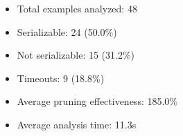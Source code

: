 \begin{itemize}
\item Total examples analyzed: 48
\item Serializable: 24 (50.0\%)
\item Not serializable: 15 (31.2\%)
\item Timeouts: 9 (18.8\%)
\item Average pruning effectiveness: 185.0\%
\item Average analysis time: 11.3s
\end{itemize}
